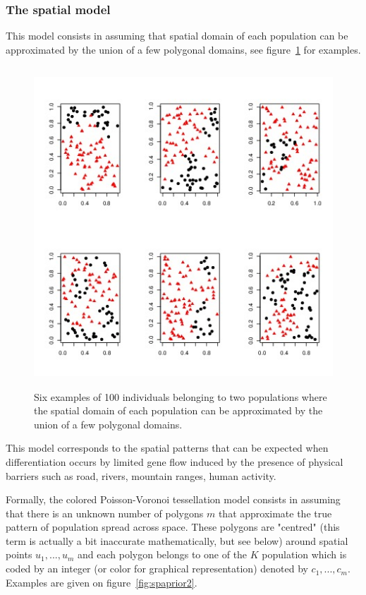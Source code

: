 \documentclass[a4paper,10pt]{article}
\begin{document}
\subsubsection{The spatial model}

This model consists in assuming that spatial domain of each population can be approximated by the union of a few polygonal domains, 
see figure~\ref{fig:spaprior} for examples. 

\begin{figure}[h]
\includegraphics[height=12cm,width=17cm]{./fig/example_spatial2_bis.jpeg}
\caption{Six examples of 100 individuals belonging to two populations  where the 
spatial domain of each population can be approximated by the union of a few polygonal domains. }\label{fig:spaprior}
\end{figure}


This model corresponds to the spatial patterns that can be expected when differentiation occurs by limited gene flow induced by the presence 
of physical barriers such as road, rivers, mountain ranges, human activity.

Formally, the colored Poisson-Voronoi tessellation model consists in assuming that there is an unknown number of polygons $m$ 
that approximate the true pattern of population spread across space. 
These polygons are "centred" (this term is actually a bit inaccurate mathematically, but see below) around spatial points 
$u_1,...,u_m$ and each polygon belongs to one of the $K$ population which is coded by an integer (or color for graphical representation) 
denoted by $c_1,...,c_m$. Examples are given on figure~\ref{fig:spaprior2}. 
\end{document}
